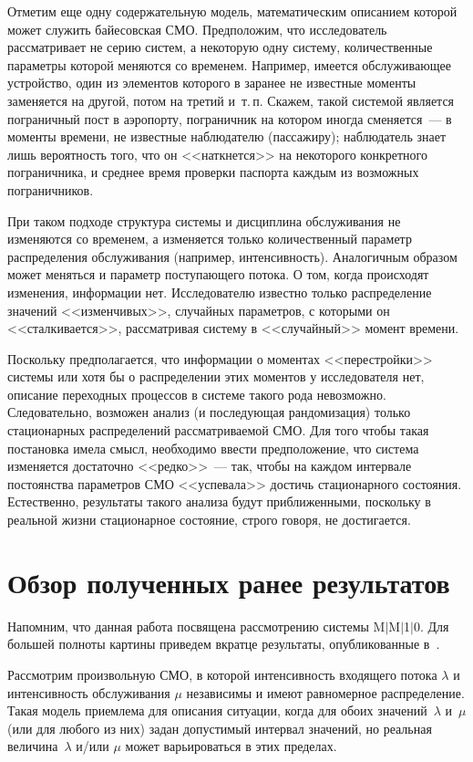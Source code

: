 \begin{multicols}{2}
{}

Отметим еще одну содержательную модель, математическим описанием которой может служить байесовская СМО. Предположим,
что исследователь рассматривает не серию систем, а некоторую одну систему, количественные параметры которой меняются со
временем. Например, имеется обслуживающее устройство, один из элементов которого в заранее не известные моменты
заменяется на другой, потом на третий и~т.\,п. Скажем, такой системой является пограничный пост в аэропорту, пограничник
на котором иногда сменяется~--- в моменты времени, не известные наблюдателю (пассажиру); наблюдатель знает лишь
вероятность того, что он <<наткнется>> на некоторого конкретного пограничника, и среднее время проверки паспорта каждым
из возможных пограничников.

При таком подходе структура системы и дис\-цип\-ли\-на обслуживания не изменяются со временем, а изменяется только
количественный параметр распределения обслуживания (например, интенсивность). Аналогичным образом может меняться и
параметр поступающего потока. О том, когда происходят изменения, информации нет. Исследователю известно только
распределение значений <<изменчивых>>, случайных параметров, с которыми он <<сталкивается>>, рассматривая систему в
<<случайный>> момент времени.

Поскольку предполагается, что информации о моментах <<перестройки>> системы или хотя бы о распределении этих моментов у
исследователя нет, описание переходных процессов в системе такого рода невозможно. Следовательно, возможен анализ (и
последующая рандомизация) только стационарных распределений рассматриваемой СМО. Для того чтобы такая постановка имела
смысл, необходимо ввести предположение, что система изменяется достаточно <<редко>>~--- так, чтобы на каждом интервале
постоянства параметров СМО <<успевала>> достичь стационарного состояния. Естественно, результаты такого анализа будут
приближенными, поскольку в реальной жизни стационарное состояние, строго говоря, не достигается.

\section{Обзор полученных ранее результатов}

Напомним, что данная работа посвящена рассмотрению системы M$\vert$M$\vert$1$\vert$0. Для большей полноты картины приведем вкратце
результаты, опубликованные в~\cite{Apice06}.

Рассмотрим произвольную СМО, в которой интенсивность входящего потока $\lambda$ и
интенсивность обслуживания $\mu$ независимы и имеют равномерное распределение. Такая модель приемлема для описания
ситуации, когда для обоих значений~$\lambda$ и~$\mu$ (или для любого из них) задан допустимый интервал значений, но
реальная величина~$\lambda$ и/или $\mu$ может варьироваться в этих пределах.


\end{multicols}
